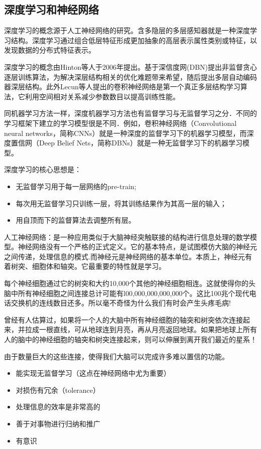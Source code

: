 \documentclass[10pt,journal,compsoc]{IEEEtran}
\begin{document}
\subsection{深度学习和神经网络}
深度学习的概念源于人工神经网络的研究。含多隐层的多层感知器就是一种深度学习结构。深度学习通过组合低层特征形成更加抽象的高层表示属性类别或特征，以发现数据的分布式特征表示。\par
深度学习的概念由Hinton等人于2006年提出。基于深信度网(DBN)提出非监督贪心逐层训练算法，为解决深层结构相关的优化难题带来希望，随后提出多层自动编码器深层结构。此外Lecun等人提出的卷积神经网络是第一个真正多层结构学习算法，它利用空间相对关系减少参数数目以提高训练性能。\par
同机器学习方法一样，深度机器学习方法也有监督学习与无监督学习之分．不同的学习框架下建立的学习模型很是不同．例如，卷积神经网络（Convolutional neural networks，简称CNNs）就是一种深度的监督学习下的机器学习模型，而深度置信网（Deep Belief Nets，简称DBNs）就是一种无监督学习下的机器学习模型。\par
深度学习的核心思想是：
\begin{itemize}
\item 无监督学习用于每一层网络的pre-train;
\item 每次用无监督学习只训练一层，将其训练结果作为其高一层的输入；
\item 用自顶而下的监督算法去调整所有层。
\end{itemize}\par
人工神经网络：是一种应用类似于大脑神经突触联接的结构进行信息处理的数学模型。神经网络没有一个严格的正式定义。它的基本特点，是试图模仿大脑的神经元之间传递，处理信息的模式.而神经元是神经网络的基本单位。本质上，神经元有着树突、细胞体和轴突。它最重要的特性就是学习。\par
每个神经细胞通过它的树突和大约10,000个其他的神经细胞相连。这就使得你的头脑中所有神经细胞之间连接总计可能有l00,000,000,000,000个。这比100兆个现代电话交换机的连线数目还多。所以毫不奇怪为什么我们有时会产生头疼毛病!\par
曾经有人估算过，如果将一个人的大脑中所有神经细胞的轴突和树突依次连接起来，并拉成一根直线，可从地球连到月亮，再从月亮返回地球。如果把地球上所有人的脑中的神经细胞的轴突和树突连接起来，则可以伸展到离开我们最近的星系！\par
由于数量巨大的这些连接，使得我们大脑可以完成许多难以置信的功能。
\begin{itemize}
\item 能实现无监督学习（这点在神经网络中尤为重要）
\item 对损伤有冗余（tolerance）
\item 处理信息的效率是非常高的
\item 善于对事物进行归纳和推广 
\item 有意识
\end{itemize}
\end{document}
